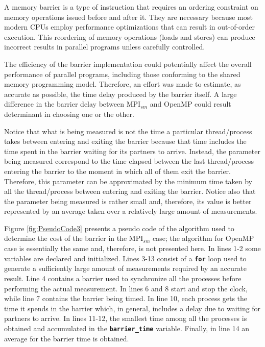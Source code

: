 A memory barrier is a type of instruction that requires an ordering constraint on memory operations issued before and after it. They are necessary because most modern CPUs employ performance optimizations that can result in out-of-order execution. This reordering of memory operations (loads and stores) can produce incorrect results in parallel programs unless carefully controlled.

\medskip


The efficiency of the barrier implementation could potentially affect the overall performance of parallel programs, including those conforming to the shared memory programming model. Therefore, an effort was made to estimate, as accurate as possible, the time delay produced by the barrier itself. A large difference in the barrier delay between MPI$_{sm}$ and OpenMP could result determinant in choosing one or the other.

\medskip

Notice that what is being measured is not the time a particular thread/process takes between entering and exiting
the barrier because that time includes the time spent in the barrier waiting for its partners to arrive. Instead, the parameter being measured correspond to the time elapsed between the last thread/process entering the barrier to the moment in which all of them exit the barrier\cite{Schmidt_2012}. Therefore, this parameter can be approximated by the minimum time taken by all the thread/process between entering and exiting the barrier. Notice also that the parameter being measured is rather small and, therefore, its value is better represented by an average taken over a relatively large amount of measurements.


\medskip

Figure \ref{fig:PseudoCode3} presents a pseudo code of the algorithm used to determine the cost of the barrier in the MPI$_{sm}$ case; the algorithm for OpenMP case is essentially the same and, therefore, is not presented here. In lines 1-2 some variables are declared and initialized. Lines 3-13 consist of a \textbf{\texttt{for}} loop used to generate a sufficiently large amount of measurements required by an accurate result. Line 4 contains a barrier used to synchronize all the processes before performing the actual measurement. In lines 6 and 8 start and stop the clock, while line 7 contains the barrier being timed. In line 10, each process gets the time it spends in the barrier which, in general, includes a delay due to waiting for partners to arrive. In lines 11-12, the smallest time among all the processes is obtained and accumulated in the \textbf{\texttt{barrier\_time}} variable. Finally, in line 14 an average for the barrier time is obtained.


